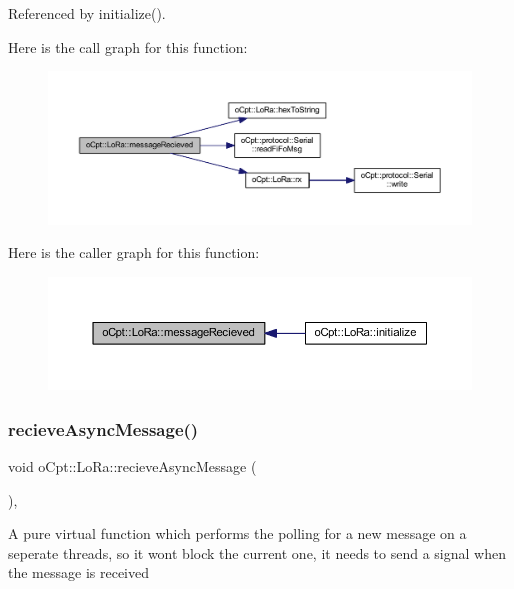 Referenced by initialize().

Here is the call graph for this function\+:\nopagebreak
\begin{figure}[H]
\begin{center}
\leavevmode
\includegraphics[width=350pt]{classo_cpt_1_1_lo_ra_a606eeaec7fb73b483f958005444246b4_cgraph}
\end{center}
\end{figure}
Here is the caller graph for this function\+:\nopagebreak
\begin{figure}[H]
\begin{center}
\leavevmode
\includegraphics[width=350pt]{classo_cpt_1_1_lo_ra_a606eeaec7fb73b483f958005444246b4_icgraph}
\end{center}
\end{figure}
\hypertarget{classo_cpt_1_1_lo_ra_a6d4aa003a6ad9277998f34ee858b6264}{}\label{classo_cpt_1_1_lo_ra_a6d4aa003a6ad9277998f34ee858b6264} 
\subsubsection{\texorpdfstring{recieve\+Async\+Message()}{recieveAsyncMessage()}}
{\footnotesize\ttfamily void o\+Cpt\+::\+Lo\+Ra\+::recieve\+Async\+Message (\begin{DoxyParamCaption}{ }\end{DoxyParamCaption})\hspace{0.3cm}{\ttfamily [override]}, {\ttfamily [virtual]}}

A pure virtual function which performs the polling for a new message on a seperate threads, so it won\textquotesingle{}t block the current one, it needs to send a signal when the message is received 

